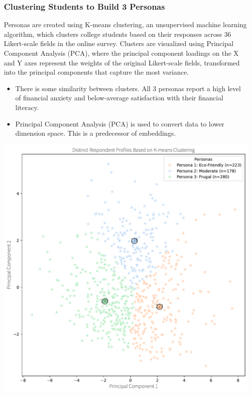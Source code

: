 \documentclass[
  letterpaper,
  DIV=11,
  numbers=noendperiod]{scrartcl}
\begin{document}
\subsubsection{Clustering Students to Build 3
Personas}\label{clustering-students-to-build-3-personas}

Personas are created using K-means clustering, an unsupervised machine
learning algorithm, which clusters college students based on their
responses across 36 Likert-scale fields in the online survey. Clusters
are visualized using Principal Component Analysis (PCA), where the
principal component loadings on the X and Y axes represent the weights
of the original Likert-scale fields, transformed into the principal
components that capture the most variance.

\begin{itemize}
\item
  There is some similarity between clusters. All 3 personas report a
  high level of financial anxiety and below-average satisfaction with
  their financial literacy.
\item
  Principal Component Analysis (PCA) is used to convert data to lower
  dimension space. This is a predecessor of embeddings.
\end{itemize}

\includegraphics{_thesis_files/figure-pdf/cell-78-output-1.pdf}
\end{document}
